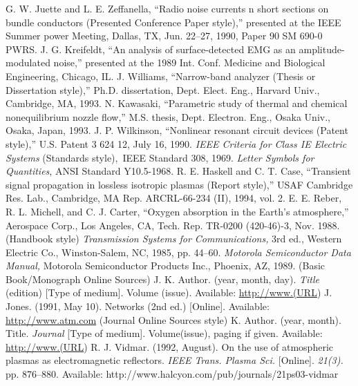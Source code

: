 \documentclass[transmag, onecolumn]{IEEEtran}
\begin{document}
\begin{thebibliography}{00}
 G. W. Juette and L. E. Zeffanella, ``Radio noise currents n short sections on bundle conductors (Presented Conference Paper style),'' presented at the IEEE Summer power Meeting, Dallas, TX, Jun. 22--27, 1990, Paper 90 SM 690-0 PWRS.
 J. G. Kreifeldt, ``An analysis of surface-detected EMG as an amplitude-modulated noise,'' presented at the 1989 Int. Conf. Medicine and Biological Engineering, Chicago, IL.
 J. Williams, ``Narrow-band analyzer (Thesis or Dissertation style),'' Ph.D. dissertation, Dept. Elect. Eng., Harvard Univ., Cambridge, MA, 1993. 
 N. Kawasaki, ``Parametric study of thermal and chemical nonequilibrium nozzle flow,'' M.S. thesis, Dept. Electron. Eng., Osaka Univ., Osaka, Japan, 1993.
 J. P. Wilkinson, ``Nonlinear resonant circuit devices (Patent style),'' U.S. Patent 3 624 12, July 16, 1990. 
 \emph{IEEE Criteria for Class IE Electric Systems} (Standards style)$,$ IEEE Standard 308, 1969.
 \emph{Letter Symbols for Quantities}, ANSI Standard Y10.5-1968.
 R. E. Haskell and C. T. Case, ``Transient signal propagation in lossless isotropic plasmas (Report style),'' USAF Cambridge Res. Lab., Cambridge, MA Rep. ARCRL-66-234 (II), 1994, vol. 2.
 E. E. Reber, R. L. Michell, and C. J. Carter, ``Oxygen absorption in the Earth's atmosphere,'' Aerospace Corp., Los Angeles, CA, Tech. Rep. TR-0200 (420-46)-3, Nov. 1988.
 (Handbook style) \emph{Transmission Systems for Communications,} 3rd ed., Western Electric Co., Winston-Salem, NC, 1985, pp. 44--60.
 \emph{Motorola Semiconductor Data Manual,} Motorola Semiconductor Products Inc., Phoenix, AZ, 1989.
 (Basic Book/Monograph Online Sources) J. K. Author. (year, month, day). \emph{Title} (edition) [Type of medium]. Volume (issue). Available: \underline {http://www.(URL})
 J. Jones. (1991, May 10). Networks (2nd ed.) [Online]. Available: \underline {http://www.atm.com}
 (Journal Online Sources style) K. Author. (year, month). Title. \emph{Journal} [Type of medium]. Volume(issue), paging if given. Available: \underline {http://www.(URL})
 R. J. Vidmar. (1992, August). On the use of atmospheric plasmas as electromagnetic reflectors. \emph{IEEE Trans. Plasma Sci.} [Online]. \emph{21(3).} pp. 876--880. Available: http://www.halcyon.com/pub/journals/21ps03-vidmar
\end{thebibliography}
\end{document}
